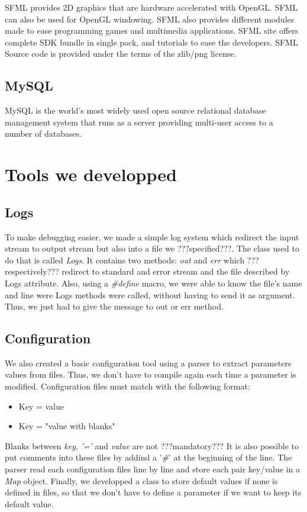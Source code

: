 \documentclass{scrreprt}
\begin{document}
		  SFML provides 2D graphics that are hardware accelerated with OpenGL. SFML can also be used for OpenGL windowing. SFML also provides different modules made to ease programming games and multimedia applications. SFML site offers complete SDK bundle in single pack, and tutorials to ease the developers. SFML Source code is provided under the terms of the zlib/png license.

		  \subsection{MySQL}
		  MySQL is the world's most widely used open source relational database management system that runs as a server providing multi-user access to a number of databases.
		  \section{Tools we developped} 
		  \subsection{Logs}
		  To make debugging easier, we made a simple log system which redirect the input stream to output stream but also into a file we ???specified???. The class used to do that is called \emph{Logs}. It contains two methods: \emph{out} and \emph{err} which ???respectively??? redirect to standard and error stream and the file described by Logs attribute. Also, using a \emph{\#define} macro, we were able to know the file's name and line were Logs methods were called, without having to send it as argument. Thus, we just had to give the message to out or err method.
		  \subsection{Configuration}
		  We also created a basic configuration tool using a parser to extract parameters values from files. Thus, we don't have to compile again each time a parameter is modified. Configuration files must match with the following format:
		  \begin{itemize}
		  \item{Key = value}
		  \item{Key = "value with blanks"}
		  \end{itemize}
		
		  Blanks between \emph{key}, \emph{'='} and \emph{value} are not ???mandatory???
		  It is also possible to put comments into these files by addind a '\emph{\#}' at the beginning of the line. The parser read each configuration files line by line and store each pair key/value in a \emph{Map} object. Finally, we developped a class to store default values if none is defined in files, so that we don't have to define a parameter if we want to keep its default value.
\end{document}
